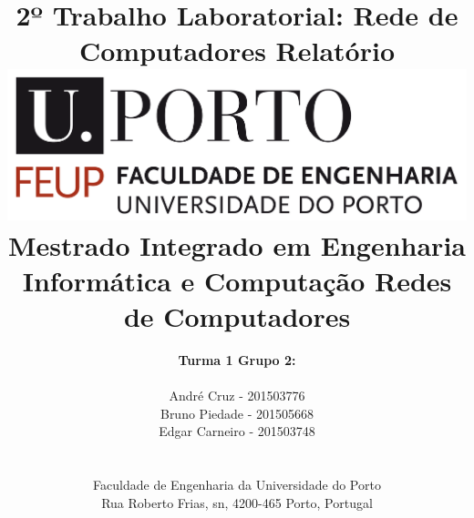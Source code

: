 \documentclass[a4paper, 11pt]{article}
\begin{document}
\setlength{\textwidth}{16cm}
\setlength{\textheight}{22cm}

\title{\Huge\textbf{2º Trabalho Laboratorial:}\linebreak\linebreak
\Huge\textbf{Rede de Computadores}\linebreak\linebreak\linebreak
\Large\textbf{Relatório}\linebreak\linebreak
\linebreak\linebreak
\includegraphics[scale=0.1]{images/feup-logo.png}\linebreak\linebreak
\linebreak
\Large{Mestrado Integrado em Engenharia Informática e Computação} \linebreak\linebreak
\Large{Redes de Computadores}\linebreak
}

\author{\textbf{Turma 1 Grupo 2:}\\
\linebreak\\
André Cruz - 201503776 \\
Bruno Piedade - 201505668 \\
Edgar Carneiro - 201503748 \\
\linebreak\linebreak \\
 \\ Faculdade de Engenharia da Universidade do Porto \\ Rua Roberto Frias, s\/n, 4200-465 Porto, Portugal \linebreak\linebreak
\linebreak\linebreak\vspace{1cm}}
\end{document}
